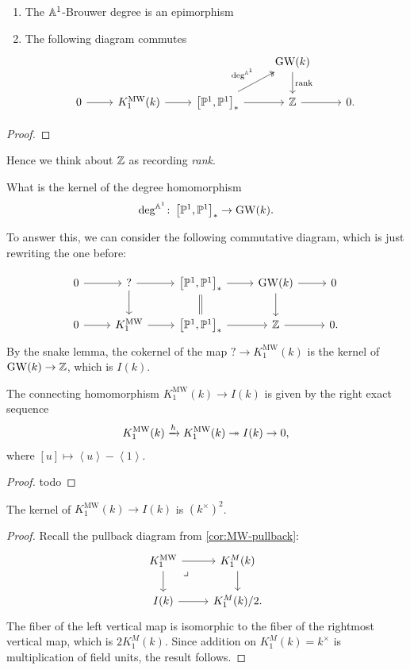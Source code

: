 \documentclass[11pt,openany]{book}
\providecommand{\MW}{\mathrm{MW}}
\begin{document}
\begin{proposition} $\ $
\begin{enumerate}
    \item The $\mathbb{A}^1$-Brouwer degree is an epimorphism
    \item The following diagram commutes
    \[ \begin{tikzcd}
     & & & \GW(k)\dar["\text{rank}" right]\\
   0\rar &  K^\MW_1(k)\rar & { \left[ \P^1,\P^1 \right]_\ast}\rar\ar[ur,two heads,"\deg^{\A^1}" above left] & \Z\rar & 0.
\end{tikzcd} \]
\end{enumerate}
\end{proposition}
\begin{proof} \todo
\end{proof}

Hence we think about $\mathbb{Z}$ as recording \textit{rank}.

\begin{question} What is the kernel of the degree homomorphism
\begin{align*}
    \deg^{\mathbb{A}^1} \colon \left[ \mathbb{P}^1,\mathbb{P}^1 \right]_\ast \to \mathrm{GW}(k).
\end{align*}
\end{question}
To answer this, we can consider the following commutative diagram, which is just rewriting the one before:

\[ \begin{tikzcd}
    0\rar & ?\rar\dar & { \left[ \P^1,\P^1 \right]_\ast}\rar\dar[equal] & \GW(k)\rar\dar & 0\\
    0\rar & K^\MW_1\rar & { \left[ \P^1,\P^1 \right]_\ast}\rar & \Z\rar & 0.
\end{tikzcd} \]
By the snake lemma, the cokernel of the map $? \to K_1^\MW(k)$ is the kernel of $\mathrm{GW}(k) \to \mathbb{Z}$, which is $I(k)$.

\begin{proposition} The connecting homomorphism $K_1^\MW(k) \to I(k)$ is given by the right exact sequence
\begin{align*}
    K_1^\MW(k) \xto{h} K_1^\MW(k) \tto I(k) \to 0,
\end{align*}
where $[u] \mapsto \left\langle u \right\rangle - \left\langle 1 \right\rangle$.
\end{proposition}
\begin{proof} todo
\end{proof}

\begin{proposition} The kernel of $K_1^\MW(k) \to I(k)$ is $(k^\times)^2$.
\end{proposition}
\begin{proof} Recall the pullback diagram from \autoref{cor:MW-pullback}:
\[ \begin{tikzcd}
    K^\MW_1\rar\dar\pb & K^M_1(k)\dar\\
    I(k)\rar & K^M_1(k)/2.
\end{tikzcd} \]
The fiber of the left vertical map is isomorphic to the fiber of the rightmost vertical map, which is $2K_1^M(k)$. Since addition on $K_1^M(k) = k^\times$ is multiplication of field units, the result follows.
\end{proof}
\end{document}

